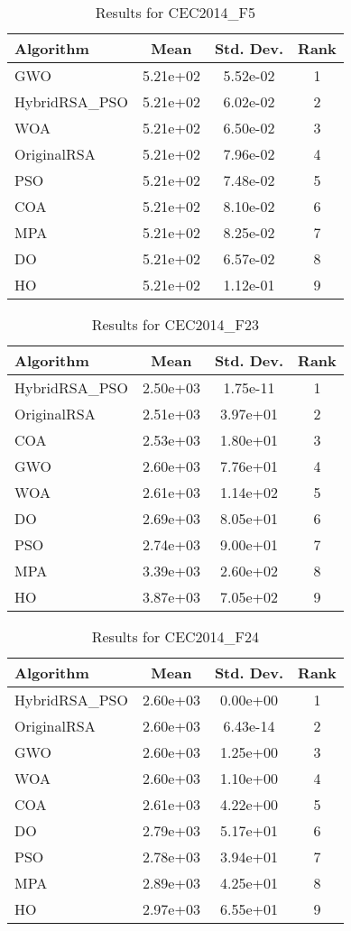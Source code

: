 \documentclass[12pt]{article}
\begin{document}
\begin{table}[H]
\centering
\caption{Results for CEC2014\_F5}
\begin{tabular}{|l|c|c|c|}
\hline
\textbf{Algorithm} & \textbf{Mean} & \textbf{Std. Dev.} & \textbf{Rank} \\
\hline
GWO & 5.21e+02 & 5.52e-02 & 1 \\
HybridRSA\_PSO & 5.21e+02 & 6.02e-02 & 2 \\
WOA & 5.21e+02 & 6.50e-02 & 3 \\
OriginalRSA & 5.21e+02 & 7.96e-02 & 4 \\
PSO & 5.21e+02 & 7.48e-02 & 5 \\
COA & 5.21e+02 & 8.10e-02 & 6 \\
MPA & 5.21e+02 & 8.25e-02 & 7 \\
DO & 5.21e+02 & 6.57e-02 & 8 \\
HO & 5.21e+02 & 1.12e-01 & 9 \\
\hline
\end{tabular}
\end{table}

\begin{table}[H]
\centering
\caption{Results for CEC2014\_F23}
\begin{tabular}{|l|c|c|c|}
\hline
\textbf{Algorithm} & \textbf{Mean} & \textbf{Std. Dev.} & \textbf{Rank} \\
\hline
HybridRSA\_PSO & 2.50e+03 & 1.75e-11 & 1 \\
OriginalRSA & 2.51e+03 & 3.97e+01 & 2 \\
COA & 2.53e+03 & 1.80e+01 & 3 \\
GWO & 2.60e+03 & 7.76e+01 & 4 \\
WOA & 2.61e+03 & 1.14e+02 & 5 \\
DO & 2.69e+03 & 8.05e+01 & 6 \\
PSO & 2.74e+03 & 9.00e+01 & 7 \\
MPA & 3.39e+03 & 2.60e+02 & 8 \\
HO & 3.87e+03 & 7.05e+02 & 9 \\
\hline
\end{tabular}
\end{table}

\begin{table}[H]
\centering
\caption{Results for CEC2014\_F24}
\begin{tabular}{|l|c|c|c|}
\hline
\textbf{Algorithm} & \textbf{Mean} & \textbf{Std. Dev.} & \textbf{Rank} \\
\hline
HybridRSA\_PSO & 2.60e+03 & 0.00e+00 & 1 \\
OriginalRSA & 2.60e+03 & 6.43e-14 & 2 \\
GWO & 2.60e+03 & 1.25e+00 & 3 \\
WOA & 2.60e+03 & 1.10e+00 & 4 \\
COA & 2.61e+03 & 4.22e+00 & 5 \\
DO & 2.79e+03 & 5.17e+01 & 6 \\
PSO & 2.78e+03 & 3.94e+01 & 7 \\
MPA & 2.89e+03 & 4.25e+01 & 8 \\
HO & 2.97e+03 & 6.55e+01 & 9 \\
\hline
\end{tabular}
\end{table}
\end{document}
